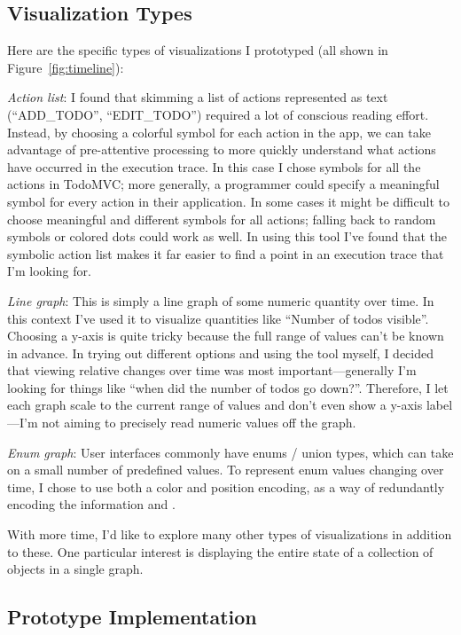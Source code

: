 \documentclass{sigchi}
\begin{document}
\hypertarget{visualization-types}{%
\subsection{Visualization Types}\label{visualization-types}}

Here are the specific types of visualizations I prototyped (all shown in
Figure~\ref{fig:timeline}):

\emph{Action list}: I found that skimming a list of actions represented
as text (``ADD\_TODO'', ``EDIT\_TODO'') required a lot of conscious
reading effort. Instead, by choosing a colorful symbol for each action
in the app, we can take advantage of pre-attentive processing to more
quickly understand what actions have occurred in the execution trace. In
this case I chose symbols for all the actions in TodoMVC; more
generally, a programmer could specify a meaningful symbol for every
action in their application. In some cases it might be difficult to
choose meaningful and different symbols for all actions; falling back to
random symbols or colored dots could work as well. In using this tool
I've found that the symbolic action list makes it far easier to find a
point in an execution trace that I'm looking for.

\emph{Line graph}: This is simply a line graph of some numeric quantity
over time. In this context I've used it to visualize quantities like
``Number of todos visible''. Choosing a y-axis is quite tricky because
the full range of values can't be known in advance. In trying out
different options and using the tool myself, I decided that viewing
relative changes over time was most important---generally I'm looking
for things like ``when did the number of todos go down?''. Therefore, I
let each graph scale to the current range of values and don't even show
a y-axis label---I'm not aiming to precisely read numeric values off the
graph.

\emph{Enum graph}: User interfaces commonly have enums / union types,
which can take on a small number of predefined values. To represent enum
values changing over time, I chose to use both a color and position
encoding, as a way of redundantly encoding the information and .

With more time, I'd like to explore many other types of visualizations
in addition to these. One particular interest is displaying the entire
state of a collection of objects in a single graph.

\hypertarget{prototype-implementation}{%
\subsection{Prototype Implementation}\label{prototype-implementation}}
\end{document}
